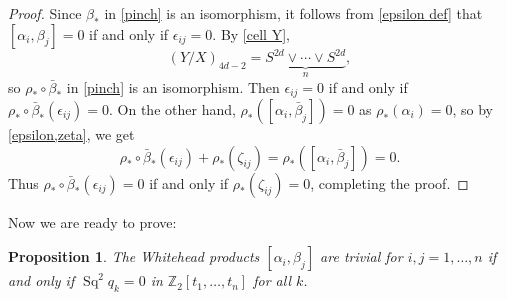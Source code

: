 \documentclass[a4paper]{amsart}
\numberwithin{equation}{section}
\newtheorem{proposition}[theorem]{Proposition}
\theoremstyle{definition}
\theoremstyle{remark}
\numberwithin{equation}{section}
\newcommand{\Z}{\mathbb{Z}}
\newcommand{\Sq}{\operatorname{Sq}}
\begin{document}
\begin{proof}
  Since $\beta_*$ in \eqref{pinch} is an isomorphism, it follows from \eqref{epsilon def} that $[\alpha_i,\beta_j]=0$ if and only if $\epsilon_{ij}=0$. By \eqref{cell Y},
  \[
    (Y/X)_{4d-2}=\underbrace{S^{2d}\vee\cdots\vee S^{2d}}_n,
  \]
  so $\rho_*\circ\bar{\beta}_*$ in \eqref{pinch} is an isomorphism. Then $\epsilon_{ij}=0$ if and only if $\rho_*\circ\bar{\beta}_*(\epsilon_{ij})=0$. On the other hand,  $\rho_*([\alpha_i,\bar{\beta}_j])=0$ as $\rho_*(\alpha_i)=0$, so by \eqref{epsilon,zeta}, we get
  \[
    \rho_*\circ\bar{\beta}_*(\epsilon_{ij})+\rho_*(\zeta_{ij})=\rho_*([\alpha_i,\bar{\beta}_j])=0.
  \]
  Thus $\rho_*\circ\bar{\beta}_*(\epsilon_{ij})=0$ if and only if $\rho_*(\zeta_{ij})=0$, completing the proof.
\end{proof}



Now we are ready to prove:



\begin{proposition}
  \label{criterion}
  The Whitehead products $[\alpha_i,\beta_j]$ are trivial for $i,j=1,\ldots,n$ if and only if $\Sq^2q_k=0$ in $\Z_2[t_1,\ldots,t_n]$ for all $k$.
\end{proposition}
\end{document}
